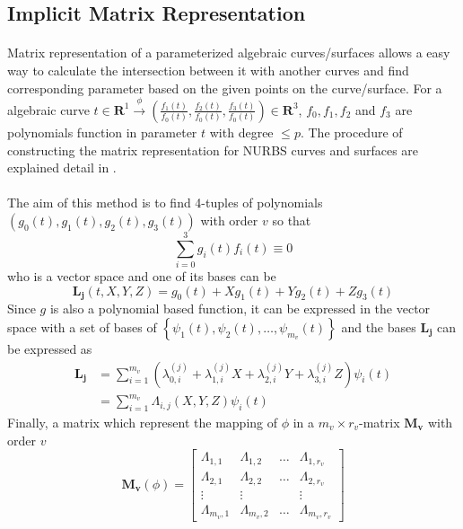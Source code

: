 \subsection{Implicit Matrix Representation}
\paragraph{} 
Matrix representation of a parameterized algebraic curves/surfaces allows a easy way to calculate the intersection between it with another curves and find corresponding parameter based on the given points on the curve/surface. For a algebraic curve $t \in \mathbf{R}^1 \xrightarrow{\phi} \left( \frac{f_1(t)}{f_0(t)}, \frac{f_2(t)}{f_0(t)},\frac{f_3(t)}{f_0(t)} \right) \in \mathbf{R}^3$, $f_0,f_1,f_2$ and $f_3$ are polynomials function in parameter $t$ with degree $\leq p$. The procedure of constructing the matrix representation for NURBS curves and surfaces are explained detail in \cite{Laurent2014}.
\paragraph{}
The aim of this method is to find 4-tuples of polynomials $\left( g_0(t),g_1(t),g_2(t),g_3(t) \right)$ with order $v$ so that
    \begin{equation}
        \sum_{i=0}^3 g_i(t) f_i(t) \equiv 0
        \label{adap_eq_mRep_eq0}
    \end{equation}
who is a vector space and one of its bases can be $$\mathbf{L_j}(t,X,Y,Z) = g_0(t) + Xg_1(t) + Yg_2(t) + Zg_3(t)$$
Since $g$ is also a polynomial based function, it can be expressed in the vector space with a set of bases of $\left\{\psi_1(t), \psi_2(t), \dots, \psi_{m_v}(t) \right\}$ and the bases $\mathbf{L_j}$ can be expressed as
    \begin{equation}
        \begin{aligned}
            \mathbf{L_j} &= \sum^{m_v}_{i=1}\left( \lambda_{0,i}^{(j)} + \lambda_{1,i}^{(j)}X + \lambda_{2,i}^{(j)}Y + \lambda_{3,i}^{(j)}Z\right)\psi_i(t)\\
        & = \sum_{i=1}^{m_v} \Lambda_{i,j}(X,Y,Z)\psi_i(t)
        \end{aligned}
    \end{equation}
Finally, a matrix which represent the mapping of $\phi$ in a $m_v \times r_v$-matrix $\mathbf{M_v}$ with order $v$
    \begin{equation}
        \mathbf{M_v}(\phi) = 
        \begin{bmatrix}
        \Lambda_{1,1} & \Lambda_{1,2} & \dots & \Lambda_{1,r_v} \\ 
        \Lambda_{2,1} & \Lambda_{2,2} & \dots & \Lambda_{2,r_v} \\ 
        \vdots 		  & \vdots 		  &  	  &\vdots			\\
        \Lambda_{m_v,1}&\Lambda_{m_v,2}&\dots &\Lambda_{m_v,r_v}
        \end{bmatrix}
    \end{equation}
\pagebreak




